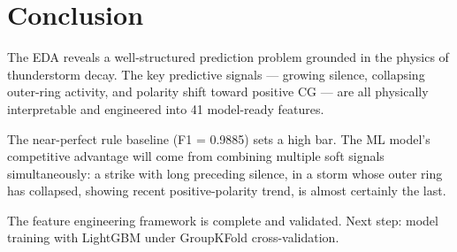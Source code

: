 \documentclass[12pt,a4paper]{article}
\begin{document}
\section{Conclusion}

The EDA reveals a well-structured prediction problem grounded in the physics of
thunderstorm decay. The key predictive signals — growing silence, collapsing outer-ring
activity, and polarity shift toward positive CG — are all physically interpretable
and engineered into 41 model-ready features.

The near-perfect rule baseline (F1 = 0.9885) sets a high bar. The ML model's
competitive advantage will come from combining multiple soft signals simultaneously:
a strike with long preceding silence, in a storm whose outer ring has collapsed,
showing recent positive-polarity trend, is almost certainly the last.

The feature engineering framework is complete and validated. Next step: model
training with LightGBM under GroupKFold cross-validation.
\end{document}
